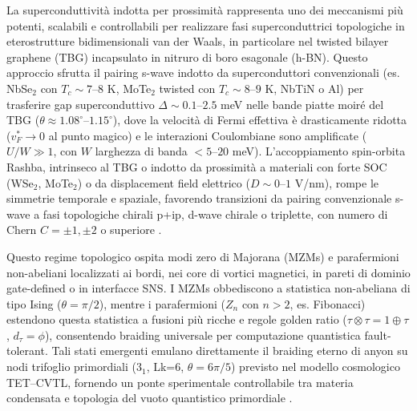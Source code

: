 \documentclass[11pt,a4paper]{article}
\let\oldcite\cite
\renewcommand{\cite}{\protect\oldcite}
\theoremstyle{plain}
\theoremstyle{definition}
\begin{document}
La superconduttività indotta per prossimità rappresenta uno dei meccanismi più potenti, scalabili e controllabili per realizzare fasi superconduttrici topologiche in eterostrutture bidimensionali van der Waals, in particolare nel twisted bilayer graphene (TBG) incapsulato in nitruro di boro esagonale (h-BN). Questo approccio sfrutta il pairing s-wave indotto da superconduttori convenzionali (es. NbSe$_2$ con $T_c \sim 7$--$8$ K, MoTe$_2$ twisted con $T_c \sim 8$--$9$ K, NbTiN o Al) per trasferire gap superconduttivo $\Delta \sim 0.1$--$2.5$ meV nelle bande piatte moiré del TBG ($\theta \approx 1.08^\circ$--$1.15^\circ$), dove la velocità di Fermi effettiva è drasticamente ridotta ($v_F^* \to 0$ al punto magico) e le interazioni Coulombiane sono amplificate ($U/W \gg 1$, con $W$ larghezza di banda $< 5$--$20$ meV). L'accoppiamento spin-orbita Rashba, intrinseco al TBG o indotto da prossimità a materiali con forte SOC (WSe$_2$, MoTe$_2$) o da displacement field elettrico ($D \sim 0$--$1$ V/nm), rompe le simmetrie temporale e spaziale, favorendo transizioni da pairing convenzionale s-wave a fasi topologiche chirali p+ip, d-wave chirale o triplette, con numero di Chern $C = \pm 1, \pm 2$ o superiore \cite{DiezCarlon2025, Bhowmik2023, Phong2024, Cao2018, Yankowitz2019, Stepanov2024, Zeng2025}.


\vspace{0.7cm}



Questo regime topologico ospita modi zero di Majorana (MZMs) e parafermioni non-abeliani localizzati ai bordi, nei core di vortici magnetici, in pareti di dominio gate-defined o in interfacce SNS. I MZMs obbediscono a statistica non-abeliana di tipo Ising ($\theta = \pi/2$), mentre i parafermioni ($Z_n$ con $n>2$, es. Fibonacci) estendono questa statistica a fusioni più ricche e regole golden ratio ($\tau \otimes \tau = 1 \oplus \tau$, $d_\tau = \phi$), consentendo braiding universale per computazione quantistica fault-tolerant. Tali stati emergenti emulano direttamente il braiding eterno di anyon su nodi trifoglio primordiali (3$_1$, Lk=6, $\theta = 6\pi/5$) previsto nel modello cosmologico TET--CVTL, fornendo un ponte sperimentale controllabile tra materia condensata e topologia del vuoto quantistico primordiale \cite{PhysSoliman2026Eternal, PhysSoliman2026Vacuum}.
\end{document}
